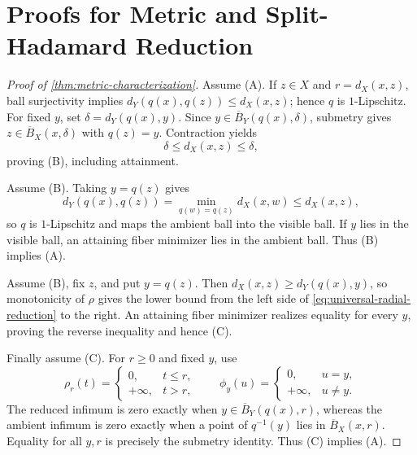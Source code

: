\section{Proofs for Metric and Split-Hadamard Reduction}
\label{app:metric-proofs}

\begin{proof}[Proof of \cref{thm:metric-characterization}]
Assume (A).  If \(z\in X\) and \(r=d_X(x,z)\), ball surjectivity implies
\(d_Y(q(x),q(z))\le d_X(x,z)\); hence \(q\) is \(1\)-Lipschitz.  For fixed
\(y\), set \(\delta=d_Y(q(x),y)\).  Since
\(y\in\overline B_Y(q(x),\delta)\), submetry gives
\(z\in\overline B_X(x,\delta)\) with \(q(z)=y\).  Contraction yields
\[
  \delta\le d_X(x,z)\le\delta,
\]
proving (B), including attainment.

Assume (B).  Taking \(y=q(z)\) gives
\[
  d_Y(q(x),q(z))
  =\min_{q(w)=q(z)}d_X(x,w)
  \le d_X(x,z),
\]
so \(q\) is \(1\)-Lipschitz and maps the ambient ball into the visible ball.
If \(y\) lies in the visible ball, an attaining fiber minimizer lies in the
ambient ball.  Thus (B) implies (A).

Assume (B), fix \(z\), and put \(y=q(z)\).  Then
\(d_X(x,z)\ge d_Y(q(x),y)\), so monotonicity of \(\rho\) gives the lower
bound from the left side of \eqref{eq:universal-radial-reduction} to the
right.  An attaining fiber minimizer realizes equality for every \(y\),
proving the reverse inequality and hence (C).

Finally assume (C).  For \(r\ge0\) and fixed \(y\), use
\[
  \rho_r(t)=\begin{cases}0,&t\le r,\\+\infty,&t>r,\end{cases}
  \qquad
  \phi_y(u)=\begin{cases}0,&u=y,\\+\infty,&u\ne y.\end{cases}
\]
The reduced infimum is zero exactly when
\(y\in\overline B_Y(q(x),r)\), whereas the ambient infimum is zero exactly
when a point of \(q^{-1}(y)\) lies in \(\overline B_X(x,r)\).  Equality for
all \(y,r\) is precisely the submetry identity.  Thus (C) implies (A).
\end{proof}

